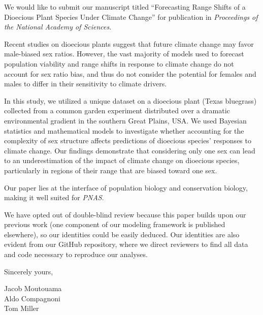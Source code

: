 \documentclass{article}
\begin{document}
We would like to submit our manuscript titled “Forecasting Range Shifts of a Dioecious Plant Species Under Climate Change” for publication in  \textit{
Proceedings of the National Academy of Sciences}.

Recent studies on dioecious plants suggest that future climate change may favor male-biased sex ratios. However, the vast majority of models used to forecast population viability and range shifts in response to climate change do not account for sex ratio bias, and thus do not consider the potential for females and males to differ in their sensitivity to climate drivers.

In this study, we utilized a unique dataset on a dioecious plant (Texas bluegrass) collected from a common garden experiment distributed over a dramatic environmental gradient in the southern Great Plains, USA. We used Bayesian statistics and mathematical models to investigate whether accounting for the complexity of sex structure affects predictions of dioecious species’ responses to climate change. Our findings demonstrate that considering only one sex can lead to an underestimation of the impact of climate change on dioecious species, particularly in regions of their range that are biased toward one sex.

Our paper lies at the interface of population biology and conservation biology, making it well suited for \textit{PNAS}.

We have opted out of double-blind review because this paper builds upon our previous work (one component of our modeling framework is published elsewhere), so our identities could be easily deduced. Our identities are also evident from our GitHub repository, where we direct reviewers to find all data and code necessary to reproduce our analyses.

\bigskip %

Sincerely yours,

\vspace{20pt} %


Jacob Moutouama \\
Aldo Compagnoni \\
Tom Miller
\end{document}
